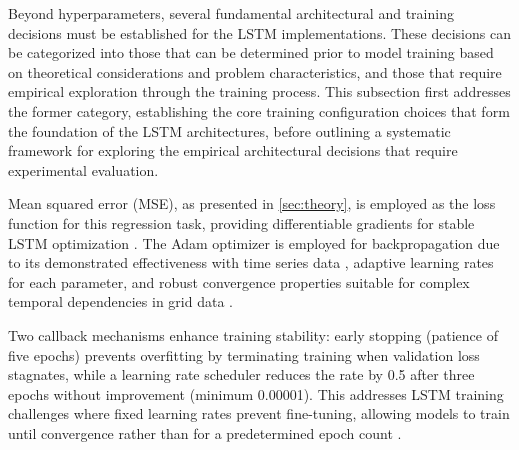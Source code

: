 Beyond hyperparameters, several fundamental architectural and training decisions must be established for the LSTM implementations. These decisions can be categorized into those that can be determined prior to model training based on theoretical considerations and problem characteristics, and those that require empirical exploration through the training process. This subsection first addresses the former category, establishing the core training configuration choices that form the foundation of the LSTM architectures, before outlining a systematic framework for exploring the empirical architectural decisions that require experimental evaluation.

Mean squared error (MSE), as presented in \autoref{sec:theory}, is employed as the loss function for this regression task, providing differentiable gradients for stable LSTM optimization \parencite{goodfellow2016}. The Adam optimizer is employed for backpropagation due to its demonstrated effectiveness with time series data \parencite{makinde2024}, adaptive learning rates for each parameter, and robust convergence properties suitable for complex temporal dependencies in grid data \parencite{chang2018}.

Two callback mechanisms enhance training stability: early stopping (patience of five epochs) prevents overfitting by terminating training when validation loss stagnates, while a learning rate scheduler reduces the rate by 0.5 after three epochs without improvement (minimum 0.00001). This addresses LSTM training challenges where fixed learning rates prevent fine-tuning, allowing models to train until convergence rather than for a predetermined epoch count \parencite{goodfellow2016}.

